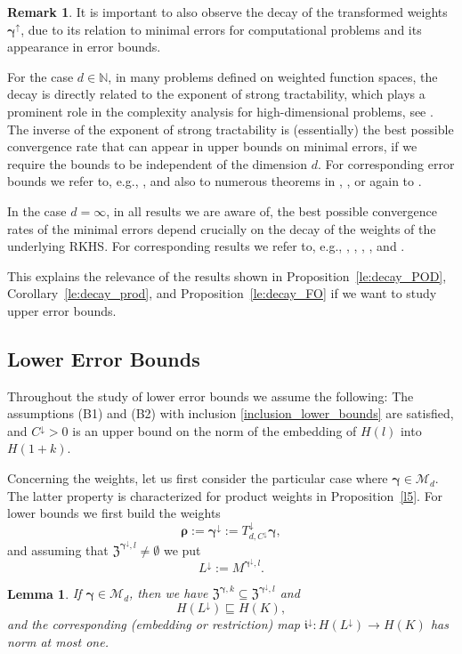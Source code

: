 \documentclass{article}
\newcommand{\N}  {{\mathbb N}}
\newcommand{\bg}{{\boldsymbol{\gamma}}}
\newcommand{\br}{{\boldsymbol{\rho}}}
\newcommand{\Z}{{\mathfrak Z}}
\newcommand{\M}  {\mathcal{M}}
\newcommand{\lo}{\downarrow}
\newcommand{\up}{\uparrow}
\theoremstyle{plain}
\newtheorem{lemma}{Lemma}
\theoremstyle{definition}
\newtheorem{rem}{Remark}
\begin{document}
\begin{rem}\label{r21}
It is important to also observe 
the decay of the transformed weights $\bg^\up$, 
due to its relation to minimal errors for 
computational problems and its appearance in error bounds. 

For the case $d \in \N$, in many problems defined on 
weighted function spaces, the decay is directly related to 
the exponent of strong tractability, which plays a 
prominent role in the 
complexity analysis for high-dimensional
problems, see \citet{NW08,NW10,NW12}.
The inverse of the exponent of strong tractability is (essentially) the 
best possible convergence rate that can appear in upper bounds on minimal 
errors, if we require the bounds to be independent of 
the dimension $d$.  For corresponding error bounds we refer to, e.g., 
\citet[Theorems~5.8 to 5.10, 5.12 and 6.10]{DKS13}, 
and also to numerous theorems in \citet{DP10}, 
\citet{DKP22}, or again to \citet{NW08,NW10,NW12}.

In the case  $d = \infty$, in all results we are aware of, the 
best possible convergence rates of the minimal errors depend 
crucially on the decay of the weights of the underlying RKHS. 
For corresponding results we refer to, e.g.,
\citet{HMNR10}, \citet{KSWW10a}, \citet{Gne10}, 
\citet{PW11}, and \citet{GRR2024}.

This explains the relevance of
the results shown in Proposition~\ref{le:decay_POD}, 
Corollary~\ref{le:decay_prod}, and Proposition~\ref{le:decay_FO}
if we want to study upper error bounds.
\end{rem}

\subsection{Lower Error Bounds}\label{s5:1}

Throughout the study of lower error bounds we assume
the following:
The assumptions (B1) and (B2) with inclusion 
\eqref{inclusion_lower_bounds} are satisfied, and
$C^\lo > 0$ is an upper bound on the 
norm of the embedding of $H(l)$ into $H(1+k)$.


Concerning the weights,
let us first consider the particular case where $\bg \in \M_{d}$. 
The latter property is characterized for product weights in 
Proposition~\ref{l5}. 
For lower bounds we first build the weights 
\[
\br := \bg^{\lo} := T^{\lo}_{d,C^\lo} \bg,
\]
and assuming that $\Z^{\bg^\lo\!,l} \neq \emptyset$ we put
\[
L^\lo := M^{\bg^\lo,l}.
\]

\begin{lemma}\label{l22}
If $\bg \in \M_d$, 
then we have $\Z^{\bg,k} \subseteq \Z^{\bg^\lo,l}$ and
\[
H(L^{\lo}) \sqsubseteq H(K), 
\]
and the corresponding (embedding or restriction) map
$\mathfrak{i}^\lo \colon H(L^\lo) \to H(K)$
has norm at most one. 
\end{lemma}
\end{document}
